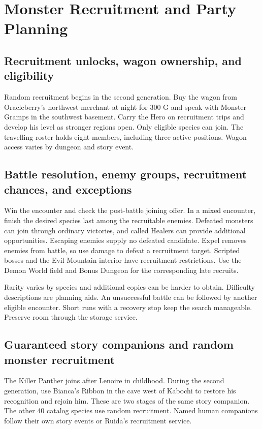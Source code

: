 \chapter{Monster Recruitment and Party Planning}
\label{written-recruitment}

\section{Recruitment unlocks, wagon ownership, and eligibility}

Random recruitment begins in the second generation. Buy the wagon from
Oracleberry's northwest merchant at night for 300 G and speak with Monster
Gramps in the southwest basement. Carry the Hero on recruitment trips and
develop his level as stronger regions open. Only eligible species can join.
The travelling roster holds eight members, including three active positions.
Wagon access varies by dungeon and story event.

\section{Battle resolution, enemy groups, recruitment chances, and exceptions}
Win the encounter and check the post-battle joining offer. In a mixed encounter,
finish the desired species last among the recruitable enemies. Defeated
monsters can join through ordinary victories, and called Healers can provide
additional opportunities. Escaping enemies supply no defeated candidate.
Expel removes enemies from battle, so use damage to defeat a recruitment target.
Scripted bosses and the Evil Mountain interior have recruitment restrictions.
Use the Demon World field and Bonus Dungeon for the corresponding late recruits.

Rarity varies by species and additional copies can be harder to obtain.
Difficulty descriptions are planning aids. An unsuccessful battle can be
followed by another eligible encounter. Short runs with a recovery stop keep
the search manageable. Preserve room through the storage service.

\section{Guaranteed story companions and random monster recruitment}
The Killer Panther joins after Lenoire in childhood. During the second
generation, use Bianca's Ribbon in the cave west of Kabochi to restore his
recognition and rejoin him. These are two stages of the same story companion.
The other 40 catalog species use random recruitment. Named human companions
follow their own story events or Ruida's recruitment service.

